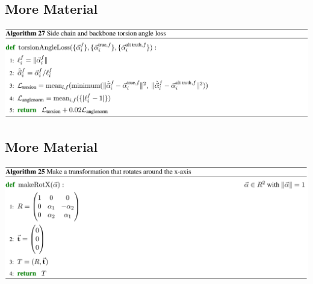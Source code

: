 \documentclass[presentation, smaller]{beamer}
\begin{document}
\subsection*{More Material}
\label{sec:org42881cd}
\begin{center}
\includegraphics[width=.9\linewidth]{./imgs/sidechain-backbonetorsion-loss-algo27.png}
\end{center}
\subsection*{More Material}
\label{sec:orga641347}
\begin{center}
\includegraphics[width=.9\linewidth]{./imgs/xaxis-transform-algo.png}
\end{center}
\end{document}
